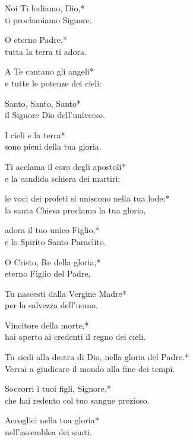 
Noi Ti lodiamo, Dio,*\\
ti proclamiamo Signore.

\spazio

O eterno Padre,*\\
tutta la terra ti adora.

\spazio

A Te cantano gli angeli*\\
e tutte le potenze dei cieli:

\spazio

Santo, Santo, Santo*\\
il Signore Dio dell'universo.

\spazio

I cieli e la terra*\\
sono pieni della tua gloria.

\spazio

Ti acclama il coro degli apostoli*\\
e la candida schiera dei martiri;

\spazio

le voci dei profeti si uniscono nella tua lode;*\\
la santa Chiesa proclama la tua gloria,

\spazio

adora il tuo unico Figlio,*\\
e lo Spirito Santo Paraclito.

\spazio

O Cristo, Re della gloria,*\\
eterno Figlio del Padre,

\spazio

Tu nascesti dalla Vergine Madre*\\
per la salvezza dell'uomo.

\spazio

Vincitore della morte,*\\
hai aperto ai credenti il regno dei cieli.

\spazio

Tu siedi alla destra di Dio, nella gloria del Padre.*\\
Verrai a giudicare il mondo alla fine dei tempi.

\spazio

Soccorri i tuoi figli, Signore,*\\
che hai redento col tuo sangue prezioso.

\spazio

Accoglici nella tua gloria*\\
nell'assemblea dei santi.

